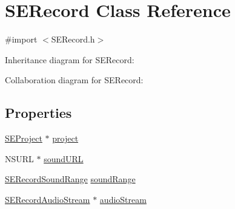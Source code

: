 \hypertarget{interface_s_e_record}{\section{S\-E\-Record Class Reference}
\label{interface_s_e_record}
}


{\ttfamily \#import $<$S\-E\-Record.\-h$>$}



Inheritance diagram for S\-E\-Record\-:


Collaboration diagram for S\-E\-Record\-:
\subsection*{Properties}
\begin{DoxyCompactItemize}
\item 
\hyperlink{interface_s_e_project}{S\-E\-Project} $\ast$ \hyperlink{interface_s_e_record_a6051966cb1a3a4f0dcf0e3963fc9d129}{project}
\item 
N\-S\-U\-R\-L $\ast$ \hyperlink{interface_s_e_record_a797e448b073754b26502fce4bc47585c}{sound\-U\-R\-L}
\item 
\hyperlink{struct_s_e_record_sound_range}{S\-E\-Record\-Sound\-Range} \hyperlink{interface_s_e_record_a4d80553d0b2ad098f0bb2555bd5fea35}{sound\-Range}
\item 
\hyperlink{interface_s_e_record_audio_stream}{S\-E\-Record\-Audio\-Stream} $\ast$ \hyperlink{interface_s_e_record_a91d05afe5637ae3b715c600c12a78bfb}{audio\-Stream}
\end{DoxyCompactItemize}


